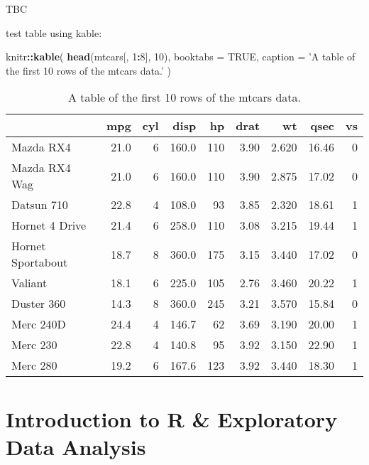 \documentclass[]{book}
\newenvironment{Shaded}{\begin{snugshade}}{\end{snugshade}}
\newcommand{\KeywordTok}[1]{\textcolor[rgb]{0.13,0.29,0.53}{\textbf{#1}}}
\newcommand{\DataTypeTok}[1]{\textcolor[rgb]{0.13,0.29,0.53}{#1}}
\newcommand{\DecValTok}[1]{\textcolor[rgb]{0.00,0.00,0.81}{#1}}
\newcommand{\StringTok}[1]{\textcolor[rgb]{0.31,0.60,0.02}{#1}}
\newcommand{\OtherTok}[1]{\textcolor[rgb]{0.56,0.35,0.01}{#1}}
\newcommand{\OperatorTok}[1]{\textcolor[rgb]{0.81,0.36,0.00}{\textbf{#1}}}
\newcommand{\NormalTok}[1]{#1}
\theoremstyle{definition}
\theoremstyle{definition}
\theoremstyle{definition}
\theoremstyle{remark}
\begin{document}
TBC

test table using kable:

\begin{Shaded}
\begin{Highlighting}[]
\NormalTok{knitr}\OperatorTok{::}\KeywordTok{kable}\NormalTok{(}
  \KeywordTok{head}\NormalTok{(mtcars[, }\DecValTok{1}\OperatorTok{:}\DecValTok{8}\NormalTok{], }\DecValTok{10}\NormalTok{), }\DataTypeTok{booktabs =} \OtherTok{TRUE}\NormalTok{,}
  \DataTypeTok{caption =} \StringTok{'A table of the first 10 rows of the mtcars data.'}
\NormalTok{)}
\end{Highlighting}
\end{Shaded}

\begin{table}

\caption{\label{tab:unnamed-chunk-3}A table of the first 10 rows of the mtcars data.}
\centering
\begin{tabular}[t]{lrrrrrrrr}
\toprule
  & mpg & cyl & disp & hp & drat & wt & qsec & vs\\
\midrule
Mazda RX4 & 21.0 & 6 & 160.0 & 110 & 3.90 & 2.620 & 16.46 & 0\\
Mazda RX4 Wag & 21.0 & 6 & 160.0 & 110 & 3.90 & 2.875 & 17.02 & 0\\
Datsun 710 & 22.8 & 4 & 108.0 & 93 & 3.85 & 2.320 & 18.61 & 1\\
Hornet 4 Drive & 21.4 & 6 & 258.0 & 110 & 3.08 & 3.215 & 19.44 & 1\\
Hornet Sportabout & 18.7 & 8 & 360.0 & 175 & 3.15 & 3.440 & 17.02 & 0\\
\addlinespace
Valiant & 18.1 & 6 & 225.0 & 105 & 2.76 & 3.460 & 20.22 & 1\\
Duster 360 & 14.3 & 8 & 360.0 & 245 & 3.21 & 3.570 & 15.84 & 0\\
Merc 240D & 24.4 & 4 & 146.7 & 62 & 3.69 & 3.190 & 20.00 & 1\\
Merc 230 & 22.8 & 4 & 140.8 & 95 & 3.92 & 3.150 & 22.90 & 1\\
Merc 280 & 19.2 & 6 & 167.6 & 123 & 3.92 & 3.440 & 18.30 & 1\\
\bottomrule
\end{tabular}
\end{table}

\section{Introduction to R \& Exploratory Data
Analysis}\label{introduction-to-r-exploratory-data-analysis}
\end{document}
